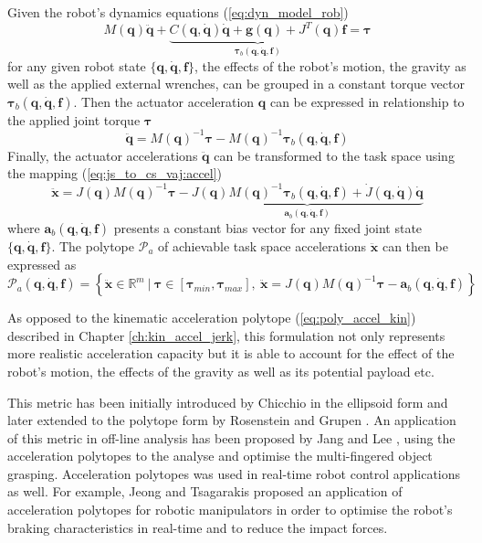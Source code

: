Given the robot's dynamics equations (\ref{eq:dyn_model_rob}) 
\begin{equation}
M(\bm{q})\ddot{\bm{q}} + \underbrace{C(\bm{q},\dot{\bm{q}})\dot{\bm{q}} + \bm{g}(\bm{q}) + J^T(\bm{q})\bm{f}}_{\bm{\tau}_b(\bm{q},\dot{\bm{q}},\bm{f}) } = \bm{\tau} 
\end{equation}
for any given robot state $\{\bm{q},\dot{\bm{q}}, \bm{f}\}$, the effects of the robot's motion, the gravity as well as the applied external wrenches, can be grouped in a constant torque vector $\bm{\tau}_b(\bm{q},\dot{\bm{q}},\bm{f})$. Then the actuator acceleration $\bm{q}$ can be expressed in relationship to the applied joint torque $\bm{\tau}$
\begin{equation}
    \ddot{\bm{q}} = M(\bm{q})^{-1}\bm{\tau} - M(\bm{q})^{-1}\bm{\tau}_b(\bm{q},\dot{\bm{q}},\bm{f})
\end{equation}
Finally, the actuator accelerations $\ddot{\bm{q}}$ can be transformed to the task space using the mapping (\ref{eq:js_to_cs_vaj:accel})
\begin{equation}
    \ddot{\bm{x}} = J(\bm{q})M(\bm{q})^{-1}\bm{\tau} - \underbrace{J(\bm{q})M(\bm{q})^{-1}\bm{\tau}_b(\bm{q},\dot{\bm{q}},\bm{f}) + \dot{J}(\bm{q}, \dot{\bm{q}})\dot{\bm{q}}}_{\bm{a}_b(\bm{q},\dot{\bm{q}},\bm{f})}
\end{equation}
where $\bm{a}_b(\bm{q},\dot{\bm{q}},\bm{f})$ presents a constant bias vector for any fixed joint state $\{\bm{q},\dot{\bm{q}},\bm{f}\}$. The polytope $\mathcal{P}_a$ of achievable task space accelerations $\ddot{\bm{x}}$ can then be expressed as
\begin{equation}
    \mathcal{P}_a(\bm{q},\dot{\bm{q}},\bm{f}) = \left\{ \ddot{\bm{x}} \in \mathbb{R}^m ~|~ \bm{\tau}\in\left[\bm{\tau}_{min}, \bm{\tau}_{max} \right], ~ \ddot{\bm{x}} = J(\bm{q})M(\bm{q})^{-1}\bm{\tau} - \bm{a}_b(\bm{q},\dot{\bm{q}},\bm{f}) \right\}
\end{equation}

As opposed to the kinematic acceleration polytope (\ref{eq:poly_accel_kin}) described in Chapter \ref{ch:kin_accel_jerk}, this formulation not only represents more realistic acceleration capacity but it is able to account for the effect of the robot's motion, the effects of the gravity as well as its potential payload etc. 

This metric has been initially introduced by Chicchio \cite{chiacchio_2000} in the ellipsoid form and later extended to the polytope form by  Rosenstein and Grupen \cite{rosenstein2002velocity}. An application of this metric in off-line analysis has been proposed by Jang and Lee \cite{Jang2009}, using the acceleration polytopes to the analyse and optimise the multi-fingered object grasping. Acceleration polytopes was used in real-time robot control applications as well. For example, Jeong and Tsagarakis \cite{jeong2006optimal} proposed an application of acceleration polytopes for robotic manipulators in order to optimise the robot's braking characteristics in real-time and to reduce the impact forces. 

